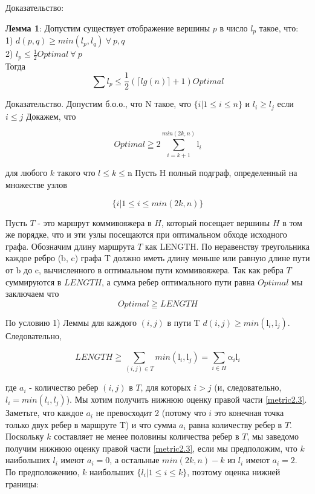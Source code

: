 \documentclass[a4paper, 14pt]{extarticle}
\numberwithin{equation}{section}
\begin{document}
Доказательство:

\textbf{Лемма 1}: Допустим существует отображение вершины $p$ в число $l_p$ такое, что:\\
1) $d(p,q) \geq min(l_p, l_q) \: \forall \: p,q$\\
2) $l_p \leq \frac{1}{2}Optimal\: \forall \: p $\\
Тогда 
\begin{equation}
\sum l_p \leq \frac{1}{2}(\lceil lg(n)\rceil+1)Optimal
\end{equation}

Доказательство.
Допустим б.о.о., что N такое, что  $\{i|1 \leq i \leq n \}$  и $l_i \geq l_j$ если $i \leq j$
Докажем, что 

\begin{equation}\label{metriclowerbound}
	{Optimal} \geqq 2\sum_{i=k+1}^{min(2k,n)}\mathrm{l}_i
\end{equation}

для любого $k$ такого что $l \leq k \leq $n
Пусть H полный подграф, определенный на множестве узлов

\begin{equation}
	{\{i|1 \leq i \leq min(2k, n)\}}
\end{equation}

Пусть $T$ - это маршрут коммивояжера в $H$, который посещает вершины $H$ в том же порядке, что и эти узлы посещаются при оптимальном обходе исходного графа. Обозначим длину маршрута $T$ как LENGTH. По неравенству треугольника каждое ребро (b, c) графа T должно иметь длину меньше или равную длине пути от b до c, вычисленного в оптимальном пути коммивояжера. Так как ребра $T$ суммируются в $LENGTH$, а сумма ребер оптимального пути равна $Optimal$ мы заключаем что
\begin{equation}
	{Optimal} \geqq {LENGTH}
\end{equation}

По условию 1) Леммы для каждого $(i, j)$ в пути T  $d (i, j)\geq min (\mathrm{l}_i, \mathrm{l}_j)$. Следовательно,

\begin{equation}\label{metric2.3}
	{LENGTH} \geqq \sum_{(i,j)\in T}^{}min(\mathrm{l}_i,\mathrm{l}_j ) = \sum_{i\in H}^{} \mathrm{\alpha}_i\mathrm{l}_i
\end{equation}

где $a_i$ - количество ребер $(i, j)$ в $T$, для которых $i > j$ (и, следовательно, $l_i=min(l_i, l_j)$).
Мы хотим получить нижнюю оценку правой части \eqref{metric2.3}. Заметьте, что каждое $a_i$ не превосходит 2 (потому что $i$ это конечная точка только двух ребер в маршруте T) и что сумма $a_i$ равна количеству ребер в $T$. Поскольку $k$ составляет не менее половины количества ребер в $T$, мы заведомо получим нижнюю оценку правой части \eqref{metric2.3}, если мы предположим, что $k$ наибольших $l_i$ имеют $a_i=0$, а остальные $min (2k, n) - k$ из $l_i$ имеют $a_i= 2$. По предположению, $k$ наибольших $\{ l_i|1 \leq i \leq k\}$, поэтому оценка нижней границы:
\end{document}
